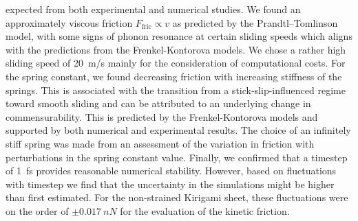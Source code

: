 expected from both experimental and numerical studies. We found an approximately viscous friction $F_{\text{fric}} \propto v$ as predicted by the Prandtl–Tomlinson model, with some signs of phonon resonance at certain sliding speeds which aligns with the predictions from the Frenkel-Kontorova models. We chose a rather high sliding speed of \SI{20}{m/s} mainly for the consideration of
computational costs. For the spring constant, we found decreasing friction with
increasing stiffness of the springs. This is associated with the transition from
a stick-slip-influenced regime toward smooth sliding and can be attributed to an underlying change in commensurability. This is predicted by the Frenkel-Kontorova models and supported by both numerical and experimental results. The choice of an
infinitely stiff spring was made from an assessment of the variation in friction with perturbations in the spring constant value. Finally, we
confirmed that a timestep of \SI{1}{fs} provides reasonable numerical stability.
However, based on fluctuations with timestep we find that the uncertainty in the
simulations might be higher than first estimated. For the non-strained Kirigami sheet, these fluctuations were on the order of $\pm \SI{0.017}{nN}$ for the evaluation of the kinetic friction.


